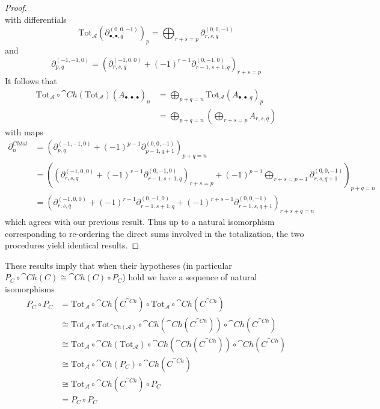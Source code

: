 \begin{proof}
\begin{equation*}
	\end{equation*}
	with differentials
	\begin{equation*}
		\text{Tot}_\mathcal{A}(\partial_{\bullet,\bullet,q}^{(0,0,-1)})_p = \bigoplus_{r+s=p}\partial_{r,s,q}^{(0,0,-1)}
	\end{equation*}
	and 
	\begin{equation*}
		\partial^{(-1,-1,0)}_{p,q} = (\partial_{r,s,q}^{(-1,0,0)}+(-1)^{r-1}\partial_{r-1,s+1,q}^{(0,-1,0)})_{r+s=p}
	\end{equation*}
	It follows that 
	\begin{align*}
		\text{Tot}_\mathcal{A}\circ \cat{Ch}(\text{Tot}_\mathcal{A})(A_{\bullet,\bullet,\bullet})_n &= \bigoplus_{p+q=n}\text{Tot}_\mathcal{A}(A_{\bullet,\bullet,q})_p \\
		&= \bigoplus_{p+q=n}\left(\bigoplus_{r+s=p}A_{r,s,q}\right)
	\end{align*}
	with maps 
	\begin{align*}
		\partial^{Chtot}_n &= (\partial^{(-1,-1,0)}_{p,q}+(-1)^{p-1}\partial^{(0,0,-1)}_{p-1,q+1})_{p+q=n} \\
		&= \left((\partial_{r,s,q}^{(-1,0,0)}+(-1)^{r-1}\partial_{r-1,s+1,q}^{(0,-1,0)})_{r+s=p}+(-1)^{p-1}\bigoplus_{r+s=p-1}\partial_{r,s,q+1}^{(0,0,-1)}\right)_{p+q=n} \\
		&= \left(\partial_{r,s,q}^{(-1,0,0)}+(-1)^{r-1}\partial_{r-1,s+1,q}^{(0,-1,0)}+(-1)^{r+s-1}\partial_{r-1,s,q+1}^{(0,0,-1)}\right)_{r+s+q=n} 
	\end{align*}
	which agrees with our previous result. Thus up to a natural isomorphism corresponding to re-ordering the direct sums involved in the totalization, the two procedures yield identical results.
\end{proof}

These results imply that when their hypotheses (in particular $P_C\circ \cat{Ch}(C)\cong \cat{Ch}(C)\circ P_C$) hold we have a sequence of natural isomorphisms 
\begin{align*}
	P_C\circ P_C &= \text{Tot}_\mathcal{A}\circ \cat{Ch}(C^{\cat{Ch}})\circ \text{Tot}_\mathcal{A}\circ \cat{Ch}(C^{\cat{Ch}}) \\
	&\cong \text{Tot}_\mathcal{A}\circ \text{Tot}_{\cat{Ch}(\mathcal{A})}\circ \cat{Ch}(\cat{Ch}(C^{\cat{Ch}}))\circ \cat{Ch}(C^{\cat{Ch}}) \\
	&\cong \text{Tot}_\mathcal{A}\circ \cat{Ch}(\text{Tot}_{\mathcal{A}})\circ \cat{Ch}(\cat{Ch}(C^{\cat{Ch}}))\circ \cat{Ch}(C^{\cat{Ch}}) \\
	&\cong \text{Tot}_\mathcal{A}\circ \cat{Ch}(P_C)\circ \cat{Ch}(C^{\cat{Ch}}) \\
	&\cong \text{Tot}_\mathcal{A}\circ \cat{Ch}(C^{\cat{Ch}})\circ P_C \\
	&= P_C\circ P_C
\end{align*}


